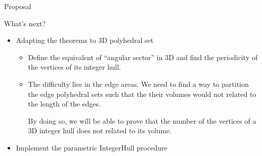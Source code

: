 \begin{frame}{Proposal}
	\begin{block}{What's next?}
		\begin{itemize}
			\item Adapting the theorems to 3D polyhedral set
			\begin{itemize}
				\item Define the equivalent of ``angular sector'' in 3D and find the periodicity of the vertices of its integer hull. \item The difficulty lies in the edge areas. We need to find a way to partition the edge polyhedral sets such that the their volumes would not related to the length of the edges. 
				
				By doing so, we will be able to prove that the number of the vertices of a 3D integer hull does not related to its volume. 
			\end{itemize}
			\item Implement the parametric IntegerHull procedure 
		\end{itemize}
	\end{block}
\end{frame}

\fi